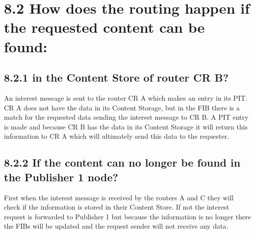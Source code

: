 \documentclass{article}
\begin{document}
	\section*{8.2 How does the routing happen if the requested content can be found:}
	\begin{adjustwidth}{2em}{2em}
		\subsection*{8.2.1 in the Content Store of router CR B?}
		\begin{adjustwidth}{2em}{2em}
			An interest message is sent to the router CR A which makes an entry in its PIT. CR A does not have the data in its Content Storage, but in the FIB there is a match for the requested data sending the interest message to CR B. A PIT entry is made and because CR B has the data in its Content Storage it will return this information to CR A which will ultimately send this data to the requester.
		\end{adjustwidth}
		\subsection*{8.2.2 If the content can no longer be found in the Publisher 1 node?}
		\begin{adjustwidth}{2em}{2em}
			First when the interest message is received by the routers A and C they will check if the information is stored in their Content Store. If not the interest request is forwarded to Publisher 1 but because the information is no longer there the FIBs will be updated and the request sender will not receive any data.
		\end{adjustwidth}
	\end{adjustwidth}
	
\end{document}
